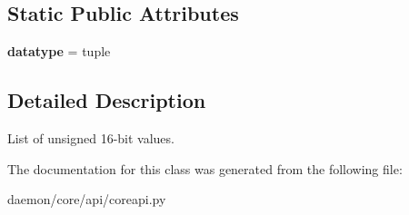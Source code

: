 \subsection*{Static Public Attributes}
\begin{DoxyCompactItemize}
\item 
\hypertarget{classcore_1_1api_1_1coreapi_1_1_core_tlv_data_uint16_list_a4f1f582faf932e88c181463e2d6e276f}{{\bfseries datatype} = tuple}\label{classcore_1_1api_1_1coreapi_1_1_core_tlv_data_uint16_list_a4f1f582faf932e88c181463e2d6e276f}

\end{DoxyCompactItemize}


\subsection{Detailed Description}
\begin{DoxyVerb}List of unsigned 16-bit values.
\end{DoxyVerb}
 

The documentation for this class was generated from the following file\+:\begin{DoxyCompactItemize}
\item 
daemon/core/api/coreapi.\+py\end{DoxyCompactItemize}
